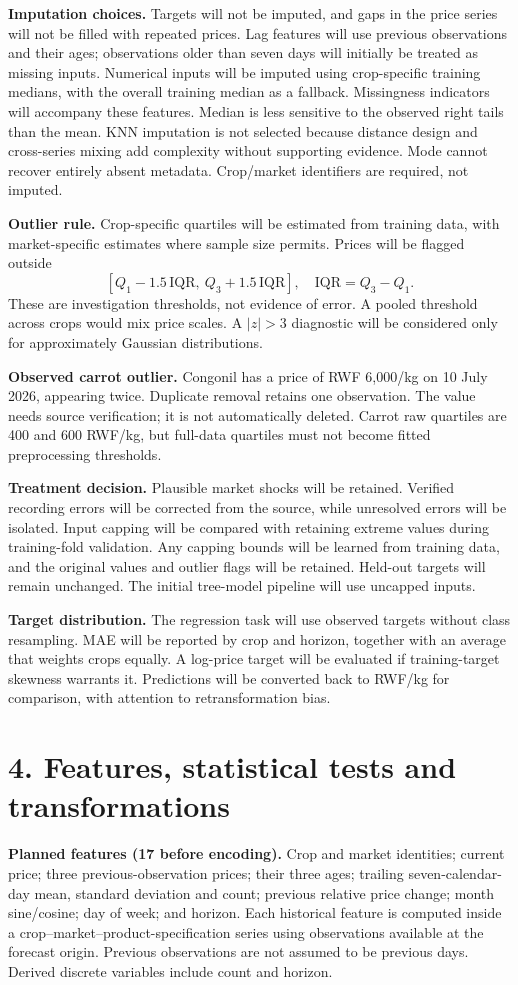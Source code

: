 \documentclass[11pt,a4paper]{article}
\begin{document}
\textbf{Imputation choices.} Targets will not be imputed, and gaps in the price series will not be filled with repeated prices. Lag features will use previous observations and their ages; observations older than seven days will initially be treated as missing inputs. Numerical inputs will be imputed using crop-specific training medians, with the overall training median as a fallback. Missingness indicators will accompany these features. Median is less sensitive to the observed right tails than the mean. KNN imputation is not selected because distance design and cross-series mixing add complexity without supporting evidence. Mode cannot recover entirely absent metadata. Crop/market identifiers are required, not imputed.

\textbf{Outlier rule.} Crop-specific quartiles will be estimated from training data, with market-specific estimates where sample size permits. Prices will be flagged outside
\[
[Q_1-1.5\,\mathrm{IQR},\ Q_3+1.5\,\mathrm{IQR}],\quad \mathrm{IQR}=Q_3-Q_1.
\]
These are investigation thresholds, not evidence of error. A pooled threshold across crops would mix price scales. A $|z|>3$ diagnostic will be considered only for approximately Gaussian distributions.

\textbf{Observed carrot outlier.} Congonil has a price of RWF 6,000/kg on 10 July 2026, appearing twice. Duplicate removal retains one observation. The value needs source verification; it is not automatically deleted. Carrot raw quartiles are 400 and 600 RWF/kg, but full-data quartiles must not become fitted preprocessing thresholds.

\textbf{Treatment decision.} Plausible market shocks will be retained. Verified recording errors will be corrected from the source, while unresolved errors will be isolated. Input capping will be compared with retaining extreme values during training-fold validation. Any capping bounds will be learned from training data, and the original values and outlier flags will be retained. Held-out targets will remain unchanged. The initial tree-model pipeline will use uncapped inputs.

\textbf{Target distribution.} The regression task will use observed targets without class resampling. MAE will be reported by crop and horizon, together with an average that weights crops equally. A log-price target will be evaluated if training-target skewness warrants it. Predictions will be converted back to RWF/kg for comparison, with attention to retransformation bias.
\newpage
\section*{4. Features, statistical tests and transformations}
\textbf{Planned features (17 before encoding).} Crop and market identities; current price; three previous-observation prices; their three ages; trailing seven-calendar-day mean, standard deviation and count; previous relative price change; month sine/cosine; day of week; and horizon. Each historical feature is computed inside a crop--market--product-specification series using observations available at the forecast origin. Previous observations are not assumed to be previous days. Derived discrete variables include count and horizon.
\end{document}

